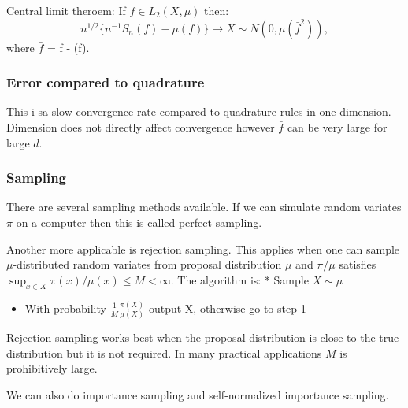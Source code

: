 \documentclass[
]{article}
\providecommand{\tightlist}{%
  \setlength{\itemsep}{0pt}\setlength{\parskip}{0pt}}
\begin{document}
Central limit theroem: If \(f \in L_{2}(X, \mu)\) then:
\[n^{1/2}\{n^{-1}S_{n}(f) - \mu(f) \} \rightarrow X \sim N(0, \mu(\bar{f}^{2})) ,\]
where \(\bar{f}\) = f - \mu(f).

\hypertarget{error-compared-to-quadrature}{%
\subsubsection{Error compared to
quadrature}\label{error-compared-to-quadrature}}

This i sa slow convergence rate compared to quadrature rules in one
dimension. Dimension does not directly affect convergence however
\(\bar{f}\) can be very large for large \(d\).

\hypertarget{sampling}{%
\subsubsection{Sampling}\label{sampling}}

There are several sampling methods available. If we can simulate random
variates \(\pi\) on a computer then this is called perfect sampling.

Another more applicable is rejection sampling. This applies when one can
sample \(\mu\)-distributed random variates from proposal distribution
\(\mu\) and \(\pi/\mu\) satisfies
\(\sup_{x\in X}\pi(x)/\mu(x) \leq M < \infty\). The algorithm is: *
Sample \(X \sim \mu\)

\begin{itemize}
\tightlist
\item
  With probability \(\frac{1}{M}\frac{\pi(X)}{\mu(X)}\) output X,
  otherwise go to step 1
\end{itemize}

Rejection sampling works best when the proposal distribution is close to
the true distribution but it is not required. In many practical
applications \(M\) is prohibitively large.

We can also do importance sampling and self-normalized importance
sampling.
\end{document}
